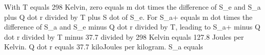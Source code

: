 With T equals 298 Kelvin,
zero equals m dot times the difference of S_e and S_a plus Q dot r divided by T plus S dot of S_e.
For S_a+ equals m dot times the difference of S_a and S_e minus Q dot r divided by T, leading to S_a+ minus Q dot r divided by T minus 37.7 divided by 298 Kelvin equals 127.8 Joules per Kelvin.
Q dot r equals 37.7 kiloJoules per kilogram.
S_a equals